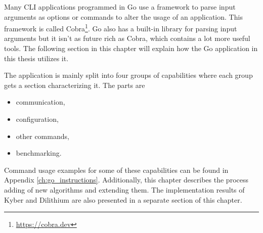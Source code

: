 Many CLI applications programmed in Go use a framework to parse input arguments as options or commands to alter the usage of an application. This framework is called Cobra\footnote{\url{https://cobra.dev}}. Go also has a built-in library for parsing input arguments but it isn't as future rich as Cobra, which contains a lot more useful tools. The following section in this chapter will explain how the Go application in this thesis utilizes it.

The application is mainly split into four groups of capabilities where each group gets a section characterizing it. The parts are
\begin{itemize}
  \item communication,
  \item configuration,
  \item other commands,
  \item benchmarking.
\end{itemize}
\noindent Command usage examples for some of these capabilities can be found in Appendix \ref{ch:go_instructions}. Additionally, this chapter describes the process adding of new algorithms and extending them. The implementation results of Kyber and Dilithium are also presented in a separate section of this chapter.
